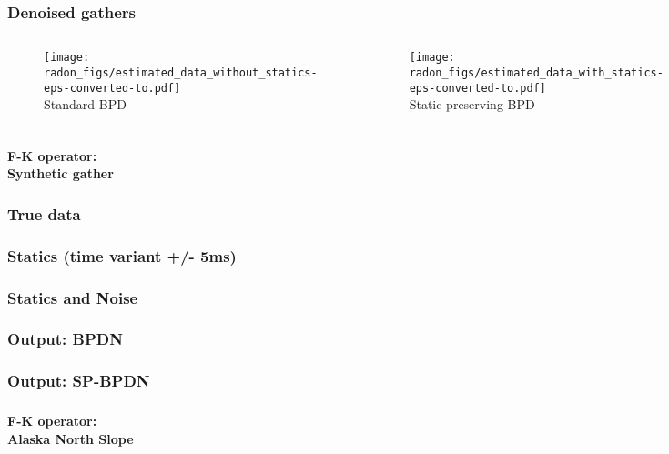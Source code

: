 \begin{frame} \frametitle{Denoised gathers}
\begin{columns}[c]
\column{2in} 
	\begin{center}
	\begin{figure} 
	\texttt{[image: radon\_figs/estimated\_data\_without\_statics-eps-converted-to.pdf]} \\ 
	\tiny Standard BPD
	\end{figure} 
	\end{center}
\column{2in}
	\begin{center}
	\begin{figure} 
	\texttt{[image: radon\_figs/estimated\_data\_with\_statics-eps-converted-to.pdf]} \\
	\tiny Static preserving BPD
	\end{figure}
	\end{center}
\end{columns}
\end{frame}

\begin{frame} \frametitle{ }
	\begin{center}
        \LARGE {\bf F-K operator:\\Synthetic gather}
	\end{center}
\end{frame}

\begin{frame} \frametitle{True data}
\end{frame}

\begin{frame} \frametitle{Statics (time variant +/- 5ms)}
\end{frame}

\begin{frame} \frametitle{Statics and Noise}
\end{frame}
\begin{frame} \frametitle{Output: BPDN}
\end{frame}
\begin{frame} \frametitle{Output: SP-BPDN}
\end{frame}

\begin{frame} \frametitle{ }
	\begin{center}
        \LARGE {\bf F-K operator:\\Alaska North Slope}
	\end{center}
\end{frame}

